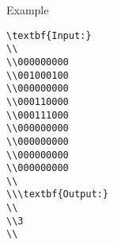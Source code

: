 Example
\begin{verbatim}
\textbf{Input:}
\\
\\000000000 
\\001000100 
\\000000000 
\\000110000 
\\000111000 
\\000000000 
\\000000000 
\\000000000 
\\000000000 
\\
\\\textbf{Output:}
\\
\\3
\\\end{verbatim}